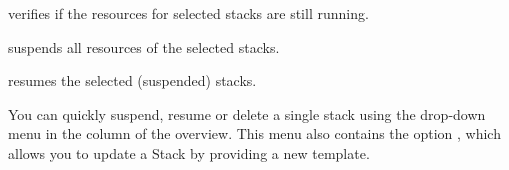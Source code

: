 \begin{description}
\item{} verifies if the resources for selected
  stacks are still running.
\item{} suspends all resources of the selected
  stacks.
\item{} resumes the selected (suspended) stacks.
\end{description}

You can quickly suspend, resume or delete a single stack using the
drop-down menu in the  column of the overview.  This
menu also contains the option , which
allows you to update a Stack by providing a new template.

